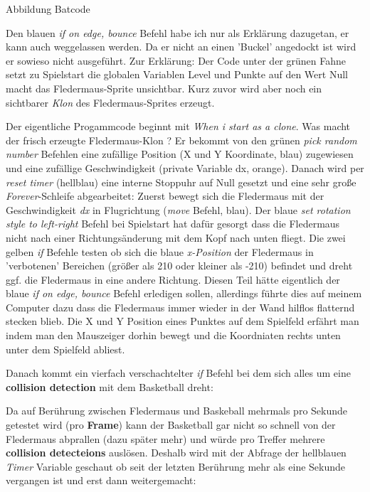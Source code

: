 \documentclass[10pt,a4paper,ngerman,twoside]{article} %
\begin{document}
\begin{multicols}{3}
\begin{center}
\footnotesize{Abbildung Batcode}
\end{center}

Den blauen \textit{if on edge, bounce} Befehl habe ich nur als Erklärung dazugetan, er kann auch weggelassen werden. Da er nicht an einen 'Buckel' angedockt ist wird er sowieso nicht ausgeführt. Zur Erklärung: Der Code unter der grünen Fahne setzt zu Spielstart die globalen Variablen Level und Punkte auf den Wert Null macht das Fledermaus-Sprite unsichtbar. Kurz zuvor wird aber noch ein sichtbarer \textit{Klon} des Fledermaus-Sprites erzeugt. 

Der eigentliche Progammcode beginnt mit \textit{When i start as a clone}. Was macht der frisch erzeugte Fledermaus-Klon ? Er bekommt von den grünen \textit{pick random number} Befehlen eine zufällige Position (X und Y Koordinate, blau) zugewiesen und eine zufällige Geschwindigkeit (private Variable dx, orange). Danach wird per \textit{reset timer} (hellblau) eine interne Stoppuhr auf Null gesetzt und eine sehr große \textit{Forever}-Schleife abgearbeitet: Zuerst bewegt sich die Fledermaus mit der Geschwindigkeit \textit{dx} in Flugrichtung (\textit{move} Befehl, blau). Der blaue \textit{set rotation style to left-right} Befehl bei Spielstart hat dafür gesorgt dass die Fledermaus nicht nach einer Richtungsänderung mit dem Kopf nach unten fliegt. Die zwei gelben \textit{if} Befehle testen ob sich die blaue \textit{x-Position} der Fledermaus in 'verbotenen' Bereichen (größer als 210 oder kleiner als -210) befindet und dreht ggf. die Fledermaus in eine andere Richtung. Diesen Teil hätte eigentlich der blaue \textit{if on edge, bounce} Befehl erledigen sollen, allerdings führte dies auf meinem Computer dazu dass die Fledermaus immer wieder in der Wand hilflos flatternd stecken blieb. Die X und Y Position eines Punktes auf dem Spielfeld erfährt man indem man den Mauszeiger dorhin bewegt und die Koordniaten rechts unten unter dem Spielfeld abliest.

Danach kommt ein vierfach verschachtelter \textit{if} Befehl bei dem sich alles um eine \textbf{collision detection} mit dem Basketball dreht:

Da auf Berührung zwischen Fledermaus und Baskeball mehrmals pro Sekunde getestet wird (pro \textbf{Frame}) kann der Basketball gar nicht so schnell von der Fledermaus abprallen (dazu später mehr) und würde pro Treffer mehrere \textbf{collision detecteions} auslösen. Deshalb wird mit der Abfrage der hellblauen \textit{Timer} Variable geschaut ob seit der letzten Berührung mehr als eine Sekunde vergangen ist und erst dann weitergemacht:


\end{multicols}
\end{document}
